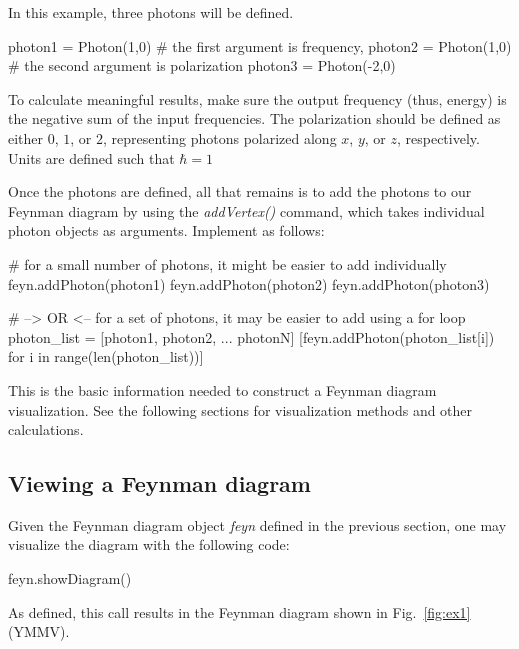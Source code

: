 \documentclass[11pt,a4paper,notitlepage]{article}
\begin{document}
In this example, three photons will be defined.

\begin{code}
photon1 = Photon(1,0)	# the first argument is frequency,
photon2 = Photon(1,0)	# the second argument is polarization
photon3 = Photon(-2,0)
\end{code}

To calculate meaningful results, make sure the output frequency (thus, energy) is the negative sum of the input frequencies. The polarization should be defined as either $0$, $1$, or $2$, representing photons polarized along $x$, $y$, or $z$, respectively. Units are defined such that $\hbar=1$

Once the photons are defined, all that remains is to add the photons to our Feynman diagram by using the \textit{addVertex()} command, which takes individual photon objects as arguments. Implement as follows:

\begin{code}
# for a small number of photons, it might be easier to add individually
feyn.addPhoton(photon1)
feyn.addPhoton(photon2)
feyn.addPhoton(photon3)

# --> OR <-- for a set of photons, it may be easier to add using a for loop
photon_list = [photon1, photon2, ... photonN]
[feyn.addPhoton(photon_list[i]) for i in range(len(photon_list))]
\end{code}

This is the basic information needed to construct a Feynman diagram visualization. See the following sections for visualization methods and other calculations.

\subsection{Viewing a Feynman diagram}

Given the Feynman diagram object \textit{feyn} defined in the previous section, one may visualize the diagram with the following code:

\begin{code}
feyn.showDiagram()
\end{code}

As defined, this call results in the Feynman diagram shown in Fig.~\ref{fig:ex1} (YMMV).
\end{document}
